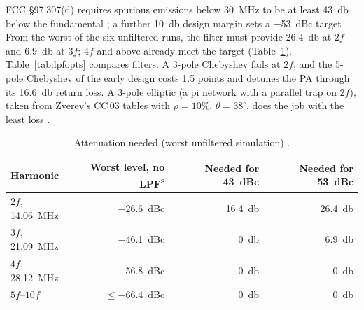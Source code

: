 \documentclass[11pt,letterpaper]{article}
\newcommand{\simv}{\textsuperscript{s}}
\begin{document}
FCC \S97.307(d) requires spurious emissions below \SI{30}{\mega\hertz} to be at least \SI{43}{\decibel} below the fundamental \cite{fcc97307}; a further \SI{10}{\decibel} design margin sets a \SI{-53}{dBc} target \cite{projnotes}. From the worst of the six unfiltered runs, the filter must provide \SI{26.4}{\decibel} at $2f$ and \SI{6.9}{\decibel} at $3f$; $4f$ and above already meet the target (Table~\ref{tab:lpfneed}). Table~\ref{tab:lpfopts} compares filters. A 3-pole Chebyshev fails at $2f$, and the 5-pole Chebyshev of the early design costs 1.5 points and detunes the PA through its \SI{16.6}{\decibel} return loss. A 3-pole elliptic (a pi network with a parallel trap on $2f$), taken from Zverev's CC\,03 tables with $\rho=10\%$, $\theta=38^\circ$, does the job with the least loss \cite[p.~175, \S5.8]{zverev1967}.

\begin{table}[h]
\centering\small
\caption{Attenuation needed (worst unfiltered simulation) \cite{projsim,projnotes}.}\label{tab:lpfneed}
\begin{tabular}{@{}lrrr@{}}
\toprule
Harmonic & Worst level, no LPF\simv & Needed for \SI{-43}{dBc} & Needed for \SI{-53}{dBc} \\ \midrule
$2f$, \SI{14.06}{\mega\hertz} & \SI{-26.6}{dBc} & \SI{16.4}{\decibel} & \SI{26.4}{\decibel} \\
$3f$, \SI{21.09}{\mega\hertz} & \SI{-46.1}{dBc} & \SI{0}{\decibel} & \SI{6.9}{\decibel} \\
$4f$, \SI{28.12}{\mega\hertz} & \SI{-56.8}{dBc} & \SI{0}{\decibel} & \SI{0}{\decibel} \\
$5f$--$10f$ & $\leq$\SI{-66.4}{dBc} & \SI{0}{\decibel} & \SI{0}{\decibel} \\
\bottomrule
\end{tabular}
\end{table}
\end{document}
